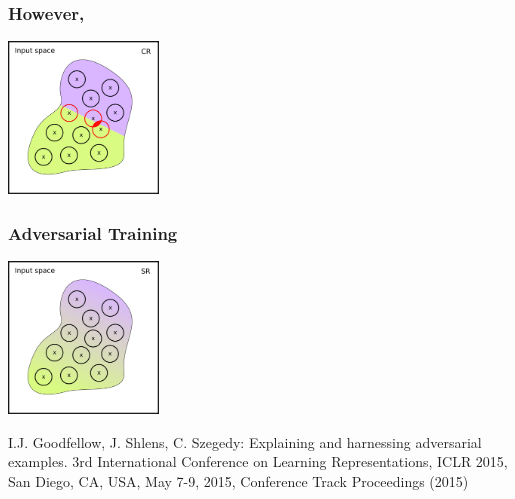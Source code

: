 \documentclass[t,compress,aspectratio=169]{beamer}
\begin{document}
\begin{frame}[fragile]
  \frametitle{However,}

  \vspace{-1em}


\begin{center}

  \includegraphics[width=4cm]{img/SR-vs-CR-5.png}

  \end{center}

 \end{frame}

 \begin{frame}[fragile]
  \frametitle{Adversarial Training}


  \vspace{-1em}

\begin{center}

  \includegraphics[width=4cm]{img/SR-vs-CR-3.png}

  \end{center}
   {\scriptsize
   \begin{thebibliography}{99}
        \beamertemplatearticlebibitems
I.J. Goodfellow, J. Shlens, C. Szegedy: Explaining and harnessing adversarial examples. 3rd International Conference on Learning Representations,
ICLR 2015, San Diego, CA, USA, May 7-9, 2015, Conference Track Proceedings (2015)
 \end{thebibliography}}
 \end{frame}
\end{document}
